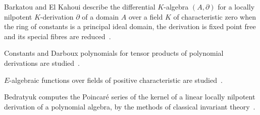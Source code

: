 Barkatou and El Kahoui describe the differential $K$-algebra $(A,\partial)$ for a locally nilpotent $K$-derivation $\partial$ of a domain $A$ over a field $K$ of characteristic zero when the ring of constants is a principal ideal domain, the derivation is fixed point free and its special fibres are reduced~\cite{WlLocallyNilpotentDerivationsWit2011}.

Constants and Darboux polynomials for tensor products of polynomial derivations are studied~\cite{WlConstantsAndDarbouxPolynomials2020}.

$E$-algebraic functions over fields of positive characteristic are studied~\cite{WlEAlgebraicFunctionsOverFieldsO2020}.

Bedratyuk computes the Poincar\'e series of the kernel of a linear locally nilpotent derivation of a polynomial algebra, by the methods of classical invariant theory~\cite{WlLinearLocallyNilpotentDerivati2009}.

